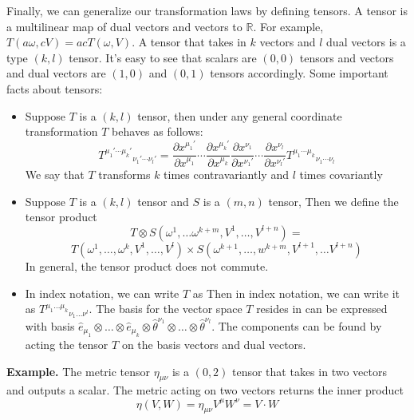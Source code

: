 \documentclass[11pt]{article}
\begin{document}
\noindent Finally, we can generalize our transformation laws by defining tensors. A tensor is a multilinear map of dual vectors and vectors to \( \mathbb{R} \). For example, \( T(a\omega, cV) = acT(\omega, V) \).
A tensor that takes in \( k \) vectors and \( l \) dual vectors is a type \( (k, l) \) tensor. It's easy to see that scalars are \( (0,0) \) tensors
and vectors and dual vectors are \( (1, 0) \) and \( (0, 1) \) tensors accordingly. Some important facts about tensors:

\begin{itemize}
    \item Suppose \( T \) is a \( (k,l) \) tensor, then under any general coordinate transformation \(T\) behaves as follows:
    \[
        T^{\mu_1' \cdots \mu_k'}{}_{\nu_1' \cdots \nu_l'} = \frac{\partial x^{\mu_1'}}{\partial x^{\mu_1}} \cdots \frac{\partial x^{\mu_k'}}{\partial x^{\mu_k}} \frac{\partial x^{\nu_1}}{\partial x^{\nu_1'}} \cdots \frac{\partial x^{\nu_l}}{\partial x^{\nu_l'}} T^{\mu_1 \cdots \mu_k}{}_{\nu_1 \cdots \nu_l}
    \]
    We say that \(T\) transforms \(k\) times contravariantly and \(l\) times covariantly

    \item Suppose \( T \) is a \( (k,l) \) tensor and \( S \) is a \( (m,n) \) tensor, Then we define the tensor product 
    \[ T \otimes S(\omega^{1}, \ldots \omega^{k+m}, V^{1}, \ldots, V^{l+n} ) = \]
    \[ T(\omega^{1},\ldots, \omega^{k}, V^{1}, \ldots, V^{l}) \times S(\omega^{k+1}, \ldots, w^{k+m}, V^{l+1}, \ldots V^{l+n}) \]
    \noindent In general, the tensor product does not commute. 

    \item In index notation, we can write \( T \) as Then in index notation, we can write it as \( T^{\mu_{1}\ldots \mu_{k}}{}_{\nu_{1}\ldots \nu^{l}} \). The basis for the vector space \( T \)
    resides in can be expressed with basis \( \hat{e}_{\mu_{1}} \otimes \ldots \otimes \hat{e}_{\mu_{k}} \otimes \hat{\theta}^{\nu_{1}} \otimes \ldots \otimes \hat{\theta}^{\nu_{l}} \). The components can be found by acting
    the tensor \( T \) on the basis vectors and dual vectors. 

\end{itemize}

\noindent \label{metric}\textbf{Example.} The metric tensor \( \eta_{\mu \nu} \) is a \( (0,2) \) tensor that takes in two vectors and outputs a scalar. The metric acting on two vectors returns the inner product
\[ 
     \eta(V,W) = \eta_{\mu \nu} V^{\mu}W^{\nu} = V \cdot W
\]
\end{document}
